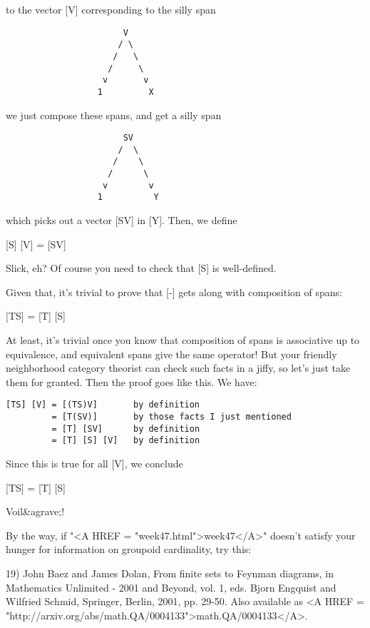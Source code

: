 to the vector [V] corresponding to the silly span

\begin{verbatim}
                       V
                      / \
                     /   \
                    /     \
                   v       v
                  1         X
\end{verbatim}
    
we just compose these spans, and get a silly span

\begin{verbatim}
                       SV
                      /  \
                     /    \
                    /      \
                   v        v
                  1          Y
\end{verbatim}
    
which picks out a vector [SV] in [Y].  Then, we define

[S] [V] = [SV]

Slick, eh?  Of course you need to check that [S] is well-defined.

Given that, it's trivial to prove that [-] gets along with 
composition of spans:

[TS] = [T] [S]

At least, it's trivial once you know that composition of spans is 
associative up to equivalence, and equivalent spans give the same 
operator!  But your friendly neighborhood category theorist can check
such facts in a jiffy, so let's just take them for granted.  Then 
the proof goes like this.  We have:

\begin{verbatim}
[TS] [V] = [(TS)V]       by definition 
         = [T(SV)]       by those facts I just mentioned
         = [T] [SV]      by definition 
         = [T] [S] [V]   by definition 
\end{verbatim}
    
Since this is true for all [V], we conclude

[TS] = [T] [S]

Voil&agrave;!

By the way, if "<A HREF = "week47.html">week47</A>" doesn't satisfy your hunger for information on
groupoid cardinality, try this: 

19) John Baez and James Dolan, From finite sets to Feynman diagrams, in 
Mathematics Unlimited - 2001 and Beyond, vol. 1, eds. Bjorn Engquist 
and Wilfried Schmid, Springer, Berlin, 2001, pp. 29-50.  Also 
available as <A HREF = "http://arxiv.org/abs/math.QA/0004133">math.QA/0004133</A>.

